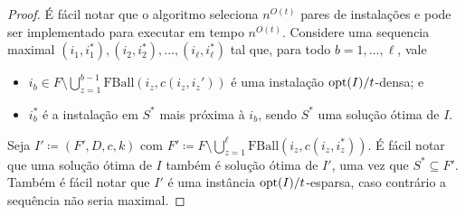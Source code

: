 \begin{proof}
    É fácil notar que o algoritmo seleciona $n^{O(t)}$ pares de instalações e pode ser implementado para executar em tempo $n^{O(t)}$. Considere uma sequencia maximal $(i_1,i_1^*), (i_2,i_2^*), \ldots, (i_{\ell},i_{\ell}^*)$ tal que, para todo $b = 1, \ldots, \ell$, vale
    \begin{itemize}
        \item $i_b \in F \setminus \bigcup_{z=1}^{b-1} \text{FBall}(i_z,c(i_z,i_z'))$ é uma instalação $\mathrm{opt}(I)/t$-densa; e
        \item $i_b^*$ é a instalação em $S^*$ mais próxima à $i_b$, sendo $S^*$ uma solução ótima de $I$.
    \end{itemize}
    Seja $I' \coloneqq (F',D,c,k)$ com $F' \coloneqq F \setminus \bigcup_{z=1}^{\ell} \text{FBall}(i_z,c(i_z,i_z^*))$. É fácil notar que uma solução ótima de $I$ também é solução ótima de $I'$, uma vez que $S^* \subseteq F'$. Também é fácil notar que $I'$ é uma instância $\mathrm{opt}(I)/t$-esparsa, caso contrário a sequência não seria maximal.


\end{proof}

